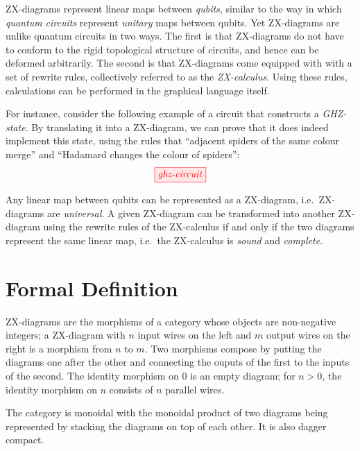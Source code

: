\documentclass[a4paper, 12pt]{article}
\begin{document}
ZX-diagrams represent linear maps between \emph{qubits}, similar to the way in which \emph{quantum circuits} represent \emph{unitary} maps between qubits. Yet ZX-diagrams are unlike quantum circuits in two ways. The first is that ZX-diagrams do not have to conform to the rigid topological structure of circuits, and hence can be deformed arbitrarily. The second is that ZX-diagrams come equipped with with a set of rewrite rules, collectively referred to as the \emph{ZX-calculus}. Using these rules, calculations can be performed in the graphical language itself.

For instance, consider the following example of a circuit that constructs a \emph{GHZ-state}. By translating it into a ZX-diagram, we can prove that it does indeed implement this state, using the rules that ``adjacent spiders of the same colour merge'' and ``Hadamard changes the colour of spiders'':
\begin{equation*}
    \tikzfig{ghz-circuit}
\end{equation*}

Any linear map between qubits can be represented as a ZX-diagram, i.e.\ ZX-diagrams are \emph{universal}. A given ZX-diagram can be transformed into another ZX-diagram using the rewrite rules of the ZX-calculus if and only if the two diagrams represent the same linear map, i.e.\ the ZX-calculus is \emph{sound} %
and \emph{complete}. %

\section{Formal Definition}

ZX-diagrams are the morphisms of a category whose objects are non-negative integers; a ZX-diagram with $n$ input wires on the left and $m$ output wires on the right is a morphism from $n$ to $m$.
Two morphisms compose by putting the diagrams one after the other and connecting the ouputs of the first to the inputs of the second.
The identity morphism on $0$ is an empty diagram; for $n>0$, the identity morphism on $n$ consists of $n$ parallel wires.

The category is monoidal with the monoidal product of two diagrams being represented by stacking the diagrams on top of each other. It is also dagger compact. %

% 
\end{document}
